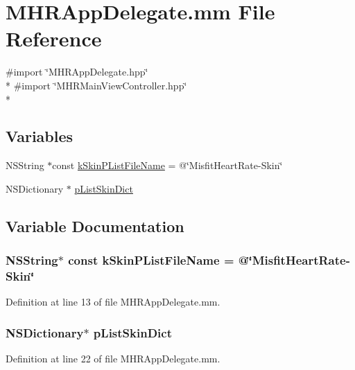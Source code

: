 \hypertarget{_m_h_r_app_delegate_8mm}{\section{M\+H\+R\+App\+Delegate.\+mm File Reference}
\label{_m_h_r_app_delegate_8mm}
}
{\ttfamily \#import \char`\"{}M\+H\+R\+App\+Delegate.\+hpp\char`\"{}}\\*
{\ttfamily \#import \char`\"{}M\+H\+R\+Main\+View\+Controller.\+hpp\char`\"{}}\\*
\subsection*{Variables}
\begin{DoxyCompactItemize}
\item 
N\+S\+String $\ast$const \hyperlink{_m_h_r_app_delegate_8mm_a9a37d4720545212bc71afc310ca8f7c4}{k\+Skin\+P\+List\+File\+Name} = @\char`\"{}Misfit\+Heart\+Rate-\/Skin\char`\"{}
\item 
N\+S\+Dictionary $\ast$ \hyperlink{_m_h_r_app_delegate_8mm_a410f9d5fa42ffb700da1838a7ad0902e}{p\+List\+Skin\+Dict}
\end{DoxyCompactItemize}


\subsection{Variable Documentation}
\hypertarget{_m_h_r_app_delegate_8mm_a9a37d4720545212bc71afc310ca8f7c4}{
\subsubsection[{k\+Skin\+P\+List\+File\+Name}]{\setlength{\rightskip}{0pt plus 5cm}N\+S\+String$\ast$ const k\+Skin\+P\+List\+File\+Name = @\char`\"{}Misfit\+Heart\+Rate-\/Skin\char`\"{}}}\label{_m_h_r_app_delegate_8mm_a9a37d4720545212bc71afc310ca8f7c4}


Definition at line 13 of file M\+H\+R\+App\+Delegate.\+mm.

\hypertarget{_m_h_r_app_delegate_8mm_a410f9d5fa42ffb700da1838a7ad0902e}{
\subsubsection[{p\+List\+Skin\+Dict}]{\setlength{\rightskip}{0pt plus 5cm}N\+S\+Dictionary$\ast$ p\+List\+Skin\+Dict}}\label{_m_h_r_app_delegate_8mm_a410f9d5fa42ffb700da1838a7ad0902e}


Definition at line 22 of file M\+H\+R\+App\+Delegate.\+mm.


